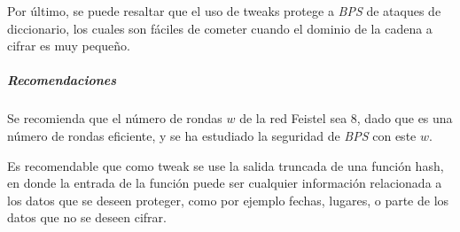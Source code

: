 Por último, se puede resaltar que el uso de tweaks protege a \textit{BPS} de 
ataques de diccionario, los cuales son fáciles de cometer cuando el dominio 
de la cadena a cifrar es muy pequeño.


\subparagraph{Recomendaciones}

Se recomienda que el número de rondas $w$ de la red Feistel sea $8$, dado 
que es una número de rondas eficiente, y se ha estudiado la seguridad de 
\textit{BPS} con este $w$.

Es recomendable que como tweak se use la salida truncada de una función hash,
en donde la entrada de la función puede ser cualquier información relacionada 
a los datos que se deseen proteger, como por ejemplo fechas, lugares, o parte 
de los datos que no se deseen cifrar.


